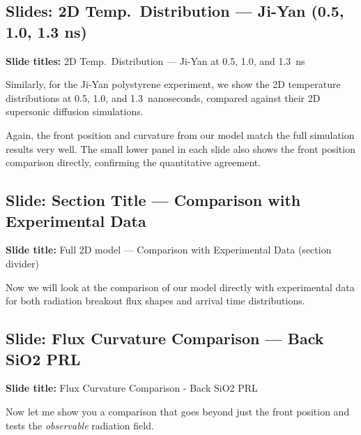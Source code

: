 \documentclass[12pt, a4paper]{article}
\begin{document}
\subsection{Slides: 2D Temp.\ Distribution --- Ji-Yan (0.5, 1.0, 1.3 ns)}

\begin{slidebox}
\textbf{Slide titles:} 2D Temp.\ Distribution --- Ji-Yan at 0.5, 1.0, and 1.3~ns
\end{slidebox}

Similarly, for the Ji-Yan polystyrene experiment, we show the 2D temperature distributions at 0.5, 1.0, and 1.3~nanoseconds, compared against their 2D supersonic diffusion simulations.

Again, the front position and curvature from our model match the full simulation results very well. The small lower panel in each slide also shows the front position comparison directly, confirming the quantitative agreement.

\subsection{Slide: Section Title --- Comparison with Experimental Data}

\begin{slidebox}
\textbf{Slide title:} Full 2D model --- Comparison with Experimental Data (section divider)
\end{slidebox}

Now we will look at the comparison of our model directly with experimental data for both radiation breakout flux shapes and arrival time distributions.

\subsection{Slide: Flux Curvature Comparison --- Back SiO2 PRL}

\begin{slidebox}
\textbf{Slide title:} Flux Curvature Comparison - Back SiO2 PRL
\end{slidebox}

Now let me show you a comparison that goes beyond just the front position and tests the \emph{observable} radiation field.
\end{document}
